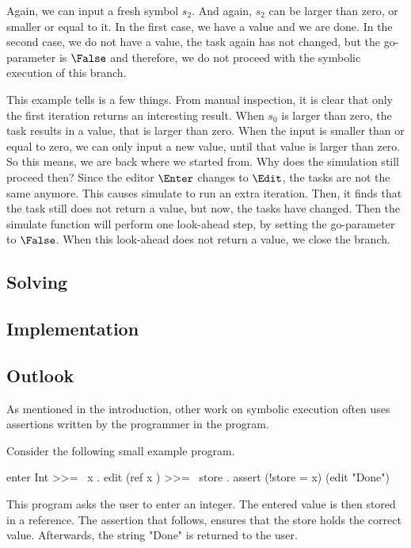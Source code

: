 Again, we can input a fresh symbol $s_2$. And again, $s_2$ can be larger than zero, or smaller or equal to it.
In the first case, we have a value and we are done.
In the second case, we do not have a value, the task again has not changed, but the go-parameter is $\False$ and therefore, we do not proceed with the symbolic execution of this branch.

This example tells is a few things.
From manual inspection, it is clear that only the first iteration returns an interesting result.
When $s_0$ is larger than zero, the task results in a value, that is larger than zero.
When the input is smaller than or equal to zero, we can only input a new value, until that value is larger than zero.
So this means, we are back where we started from.
Why does the simulation still proceed then?
Since the editor $\Enter$ changes to $\Edit$, the tasks are not the same anymore.
This causes simulate to run an extra iteration.
Then, it finds that the task still does not return a value, but now, the tasks have changed.
Then the simulate function will perform one look-ahead step, by setting the go-parameter to $\False$.
When this look-ahead does not return a value, we close the branch.

\subsection{Solving}


\subsection{Implementation}
\subsection{Outlook}
\label{subsec:outlook}

As mentioned in the introduction, other work on symbolic execution often uses assertions written by the programmer in the program.

\begin{example}
  Consider the following small example program.
  \begin{TASK}
    enter Int >>= \ x . edit (ref x ) >>= \ store . assert (!store = x) (edit "Done")
  \end{TASK}

  This program asks the user to enter an integer.
  The entered value is then stored in a reference.
  The assertion that follows, ensures that the store holds the correct value.
  Afterwards, the string "Done" is returned to the user.
\end{example}

